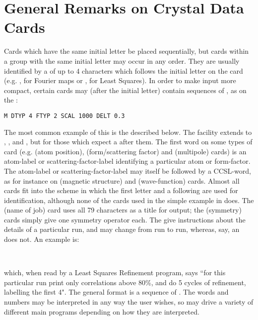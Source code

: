 \section{General Remarks on Crystal Data Cards}
Cards which have the same initial letter  be placed sequentially,
but cards within a group with the same initial letter
may occur in any order. They are usually identified by a \cw of up to 4 characters
which follows the initial letter on the card (e.g. ,
 for Fourier maps
 or ,
 for Least Squares).
\p 
In order to make input more compact, certain cards may (after the initial
letter) contain sequences of \cwnscomma, as on the :
\par 
\verb}M DTYP 4 FTYP 2 SCAL 1000 DELT 0.3}\\
\par 
The most common example of this is the  described
below. The facility extends to , ,  and , but
 for those
\cws which expect a  after them.
\p 
The first word on some types of card (e.g.  (atom position),
 (form/scattering factor) and  (multipole) cards) is an 
atom-label or scattering-factor-label identifying a particular atom or 
form-factor. The atom-label or scattering-factor-label 
may itself be followed by a
CCSL-word, as for instance on  (magnetic structure)
and  (wave-function) cards.
\p 
Almost all cards fit into the scheme in which the first letter
and a following \cw are used for identification,
although none of the cards used in the simple example in
 does.
\pn 
The  (name of job) card uses all 79 characters as a title for output;
the  (symmetry) cards simply give one symmetry operator
each.
\pn
The  give instructions about the details
of a particular run, and may change from run to run, whereas, say,
an  does not.  An example is: 
\par 
{}\\
\par 
which, when read by a Least Squares Refinement program, says ``for this
particular run print only correlations above 80\%, and do 5 cycles of
refinement, labelling the first 4".  The general format is a sequence of
\cwnscomma.  The words and numbers may be interpreted in any way
the user wishes, so  may drive a variety of different main 
programs depending on how they are interpreted.
\p 
